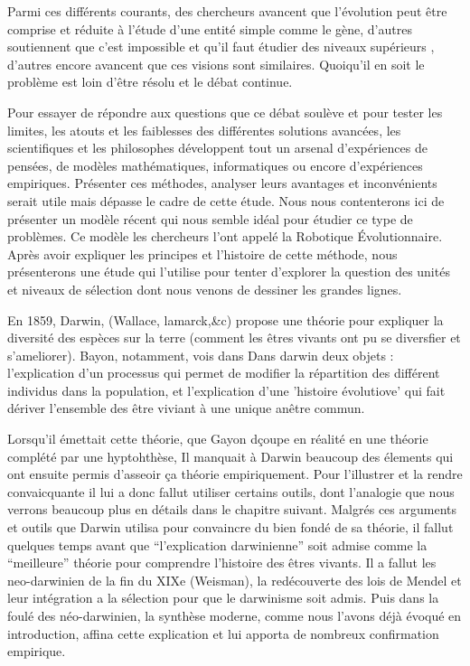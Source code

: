 Parmi ces différents courants, des chercheurs avancent que l'évolution peut être comprise et réduite à l'étude d'une entité simple comme le gène\cite{dawkins76selfishgene,dennett95darwinsdangerousideaevolutionmeaningslife}, d'autres soutiennent que c'est impossible et qu'il faut étudier des niveaux supérieurs \citep{gould2002thestructureofevolutionarytheory,wilson1989revivingsuperorganism}, d'autres encore avancent que ces visions sont similaires. Quoiqu'il en soit le problème est loin d'être résolu et le débat continue. 

Pour essayer de répondre aux questions que ce débat soulève et pour tester les limites, les atouts et les faiblesses des différentes solutions avancées, les scientifiques et les philosophes développent tout un arsenal d'expériences de pensées, de modèles mathématiques, informatiques ou encore d'expériences empiriques. Présenter ces méthodes, analyser leurs avantages et inconvénients serait utile mais dépasse le cadre de cette étude. 
Nous nous contenterons ici de présenter un modèle récent qui nous semble idéal pour étudier ce type de problèmes. Ce modèle les chercheurs l'ont appelé la Robotique \'Evolutionnaire. Après avoir expliquer les principes et l'histoire de cette méthode, nous présenterons une étude qui l'utilise pour tenter d'explorer la question des unités et niveaux de sélection dont nous venons de dessiner les grandes lignes.

En 1859, Darwin, (Wallace, lamarck,\&c) propose une théorie pour expliquer la diversité des espèces sur la terre (comment les êtres vivants ont pu se diversfier et s'ameliorer). Bayon, notamment, vois dans Dans darwin deux objets : l'explication d'un processus qui permet de modifier la répartition  des différent individus dans la population, et l'explication d'une 'histoire évolutiove' qui fait dériver l'ensemble des être viviant à une unique anêtre commun.

Lorsqu'il émettait cette théorie, que Gayon dçoupe en réalité en une théorie complété par une hyptohthèse, Il manquait à Darwin beaucoup des élements qui ont ensuite permis d'asseoir ça théorie empiriquement. Pour l'illustrer et la rendre convaicquante il lui a donc fallut utiliser certains outils, dont l'analogie que nous verrons beaucoup plus en détails dans le chapitre suivant. Malgrés ces arguments et outils que Darwin utilisa pour convaincre du bien fondé de sa théorie, il fallut quelques temps avant que ``l'explication darwinienne'' soit admise comme la ``meilleure'' théorie pour comprendre l'histoire des êtres vivants. Il a fallut les neo-darwinien de la fin du XIXe (Weisman), la redécouverte des lois de Mendel et leur intégration a la sélection pour que le darwinisme soit admis. Puis dans la foulé des néo-darwinien, la synthèse moderne, comme nous l'avons déjà évoqué en introduction, affina cette explication et lui apporta de nombreux confirmation empirique.  

